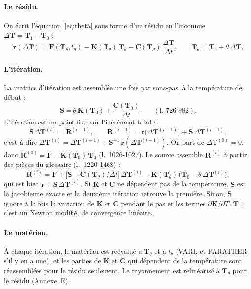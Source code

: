 \documentclass[11pt,a4paper]{article}
\numberwithin{equation}{section}
\newcommand{\pr}[1]{\textsf{#1}}                        %
\newcommand{\op}[1]{\textsf{\small #1}}                 %
\newcommand{\lig}[1]{l.~#1}
\newcommand{\vc}[1]{\symbf{#1}}                         %
\newcommand{\annref}[1]{\hyperref[annexe:#1]{Annexe~#1}}
\begin{document}
\paragraph{Le résidu.}
On écrit l'équation~\eqref{eq:theta} sous forme d'un résidu en l'inconnue $\Delta\vc T = \vc T_1 - \vc T_0$ :
\begin{equation}
\label{eq:residu-th}
\vc r(\Delta\vc T) = \vc F(\vc T_\theta, t_\theta) - \vc K(\vc T_\theta)\,\vc T_\theta - \vc C(\vc T_\theta)\,\frac{\Delta\vc T}{\Delta t},
\qquad \vc T_\theta = \vc T_0 + \theta\,\Delta\vc T .
\end{equation}

\paragraph{L'itération.}
La matrice d'itération est assemblée une fois par sous-pas, à la température de début :
\begin{equation}
\vc S = \theta\,\vc K(\vc T_0) + \frac{\vc C(\vc T_0)}{\Delta t} \qquad(\text{\lig{726-982}}).
\end{equation}
L'itération est un point fixe sur l'incrément total :
\begin{equation}
\label{eq:pointfixe}
\vc S\,\Delta\vc T^{(i)} = \vc R^{(i-1)},
\qquad
\vc R^{(i-1)} = \vc r\big(\Delta\vc T^{(i-1)}\big) + \vc S\,\Delta\vc T^{(i-1)},
\end{equation}
c'est-à-dire $\Delta\vc T^{(i)} = \Delta\vc T^{(i-1)} + \vc S^{-1}\,\vc r(\Delta\vc T^{(i-1)})$.
On part de $\Delta\vc T^{(0)} = 0$, donc $\vc R^{(0)} = \vc F - \vc K(\vc T_0)\,\vc T_0$ (\lig{1026-1027}).
Le source assemble $\vc R^{(i)}$ à partir des pièces du glossaire (\lig{1220-1468}) :
\begin{equation}
\vc R^{(i)} = \vc F + \big[\vc S - \vc C(\vc T_\theta)/\Delta t\big]\,\Delta\vc T^{(i)} - \vc K(\vc T_\theta)\,\big(\vc T_0 + \theta\,\Delta\vc T^{(i)}\big),
\end{equation}
qui est bien $\vc r + \vc S\,\Delta\vc T^{(i)}$.
Si $\vc K$ et $\vc C$ ne dépendent pas de la température, $\vc S$ est la jacobienne exacte et la deuxième itération retrouve la première.
Sinon, $\vc S$ ignore à la fois la variation de $\vc K$ et $\vc C$ pendant le pas et les termes $\partial\vc K/\partial T\cdot\vc T$ : c'est un Newton modifié, de convergence linéaire.

\paragraph{Le matériau.}
À chaque itération, le matériau est réévalué à $\vc T_\theta$ et à $t_\theta$ (\op{VARI}, et \pr{PARATHER} s'il y en a une), et les parties de $\vc K$ et $\vc C$ qui dépendent de la température sont réassemblées pour le résidu seulement.
Le rayonnement est relinéarisé à $\vc T_\theta$ pour le résidu (\annref{E}).
\end{document}

